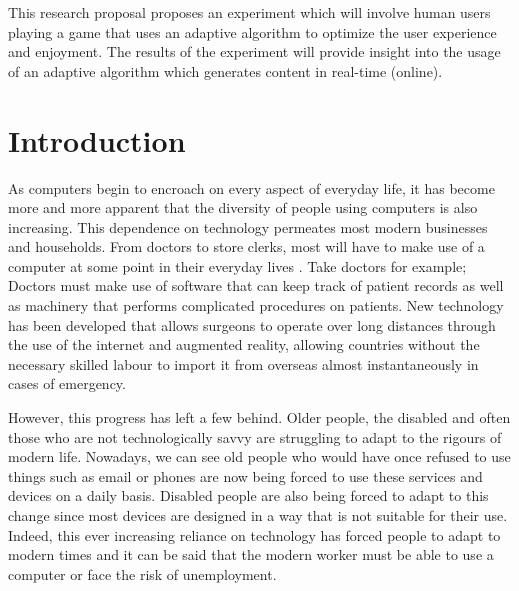 \documentclass[11pt]{article}
\begin{document}
\begin{titlepage}
\vspace{6.0 mm}

This research proposal proposes an experiment which will involve human users playing a game that uses an adaptive algorithm to optimize the user experience and enjoyment. The results of the experiment will provide insight into the usage of an adaptive algorithm which generates content in real-time (online).


\clearpage

\tableofcontents

\end{titlepage}
\clearpage
{} 
\section{Introduction}
As computers begin to encroach on every aspect of everyday life, it has become more and more apparent that the diversity of people using computers is also increasing. This dependence on technology permeates most modern businesses and households. From doctors to store clerks, most will have to make use of a computer at some point in their everyday lives \citep{beaudry2005understanding}. Take doctors for example; Doctors must make use of software that can keep track of patient records as well as machinery that performs complicated procedures on patients. New technology has been developed that allows surgeons to operate over long distances through the use of the internet and augmented reality, allowing countries without the necessary skilled labour to import it from overseas almost instantaneously in cases of emergency.
\vspace{6.0 mm}

However, this progress has left a few behind. Older people, the disabled and often those who are not technologically savvy are struggling to adapt to the rigours of modern life. Nowadays, we can see old people who would have once refused to use things such as email or phones are now being forced to use these services and devices on a daily basis. Disabled people  are also being forced to adapt to this change since most devices are designed in a way that is not suitable for their use\citep{gajos2008improving}. Indeed, this ever increasing reliance on technology has forced people to adapt to modern times and it can be said that the modern worker must be able to use a computer or face the risk of unemployment.
\vspace{6.0 mm}
\end{document}
